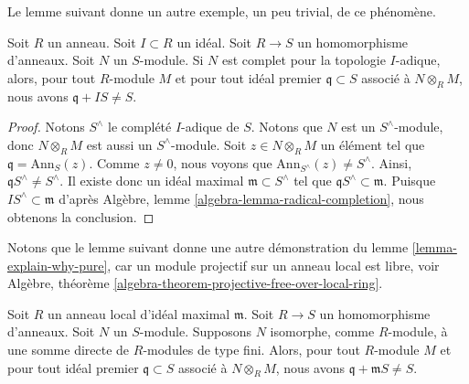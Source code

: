 \noindent
Le lemme suivant donne un autre exemple, un peu trivial, de ce phénomène.

\begin{lemma}
\label{lemma-explain-why-pure-complete}
Soit $R$ un anneau. Soit $I \subset R$ un idéal.
Soit $R \to S$ un homomorphisme d'anneaux. Soit $N$ un $S$-module.
Si $N$ est complet pour la topologie $I$-adique, alors, pour tout $R$-module $M$ et
pour tout idéal premier $\mathfrak q \subset S$ associé à
$N \otimes_R M$, nous avons $\mathfrak q + I S \not = S$.
\end{lemma}

\begin{proof}
Notons $S^\wedge$ le complété $I$-adique de $S$.
Notons que $N$ est un $S^\wedge$-module, donc
$N \otimes_R M$ est aussi un $S^\wedge$-module.
Soit $z \in N \otimes_R M$ un élément tel que
$\mathfrak q = \text{Ann}_S(z)$. Comme $z \not = 0$, nous voyons
que $\text{Ann}_{S^\wedge}(z) \not = S^\wedge$. Ainsi,
$\mathfrak q S^\wedge \not = S^\wedge$. Il existe donc un
idéal maximal $\mathfrak m \subset S^\wedge$ tel que
$\mathfrak q S^\wedge \subset \mathfrak m$. Puisque
$IS^\wedge \subset \mathfrak m$ d'après
Algèbre, lemme \ref{algebra-lemma-radical-completion},
nous obtenons la conclusion.
\end{proof}

\noindent
Notons que le lemme suivant donne une autre démonstration du
lemme \ref{lemma-explain-why-pure},
car un module projectif sur un anneau local est libre, voir
Algèbre, théorème \ref{algebra-theorem-projective-free-over-local-ring}.

\begin{lemma}
\label{lemma-explain-why-pure-direct-sum-finite-modules}
Soit $R$ un anneau local d'idéal maximal $\mathfrak m$.
Soit $R \to S$ un homomorphisme d'anneaux. Soit $N$ un $S$-module.
Supposons $N$ isomorphe, comme $R$-module, à une somme
directe de $R$-modules de type fini. Alors, pour tout $R$-module $M$ et
pour tout idéal premier $\mathfrak q \subset S$ associé à
$N \otimes_R M$, nous avons $\mathfrak q + \mathfrak m S \not = S$.
\end{lemma}

